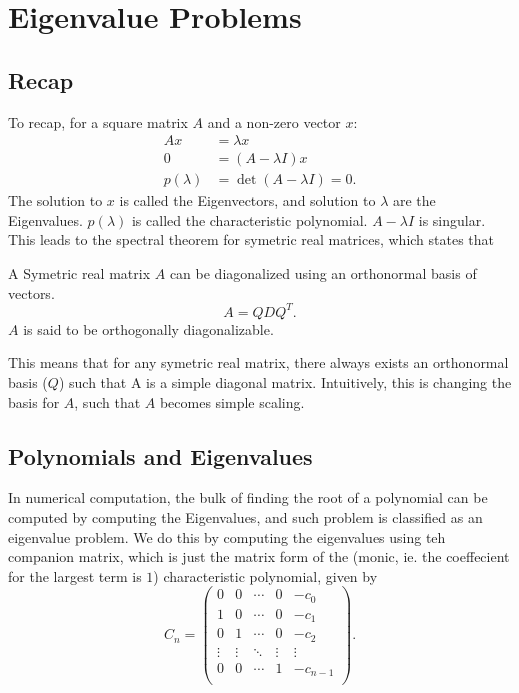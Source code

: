 \documentclass[5pt, a4paper]{article}
\begin{document}
\section{Eigenvalue Problems}
\subsection*{Recap}
    To recap, for a square matrix $A$ and a non-zero vector $x$: 
    \begin{align*}
        Ax &= \lambda x \\
        0 &= (A - \lambda I)x\\
        p(\lambda) &= \det(A - \lambda I) = 0
    .\end{align*}
    The solution to  $x$ is called the Eigenvectors, and solution to $\lambda$
    are the Eigenvalues. $p(\lambda)$ is called the characteristic polynomial.
    $A - \lambda I$ is singular. This leads to the spectral theorem for symetric
    real matrices, which states that 
    \begin{tcolorbox}[title=Spectral Theorem for Real Matrices]
        A Symetric real matrix $A$ can be diagonalized using an orthonormal
        basis of vectors. \[
        A = Q D Q^T
        .\] 
        $A$ is said to be orthogonally diagonalizable.
    \end{tcolorbox}
    This means that for any symetric real matrix, there always exists an
    orthonormal basis ($Q$) such that A is a simple diagonal matrix.
    Intuitively, this is changing the basis for $A$, such that $A$ becomes
    simple scaling.

    \subsection*{Polynomials and Eigenvalues}

    In numerical computation, the bulk of finding the root of a polynomial can
    be computed by computing the Eigenvalues, and such problem is classified
    as an eigenvalue problem. We do this by computing the eigenvalues using teh
    companion matrix, which is just the matrix form of the (monic, ie. the
    coeffecient for the largest term is $1$) characteristic polynomial, given by
    \[
    C_n = 
    \left(
    \begin{matrix}
        0 & 0 & \cdots &0& -c_0 \\
        1 & 0 & \cdots &0& -c_1 \\
        0 & 1 & \cdots &0& -c_2 \\
        \vdots & \vdots & \ddots & \vdots & \vdots \\
        0 & 0 & \cdots &1& -c_{n-1} \\
    \end{matrix}
    \right)
    .\] 
\end{document}
